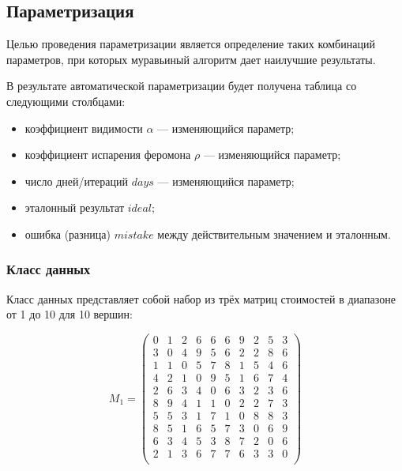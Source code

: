 \subsection{Параметризация}
Целью проведения параметризации является определение таких комбинаций параметров, при которых муравьиный алгоритм дает наилучшие результаты.

В результате автоматической параметризации будет получена таблица со следующими столбцами:
\begin{itemize}[label*={---}]
	\item коэффициент видимости $\alpha$ --- изменяющийся параметр;
	\item коэффициент испарения феромона $\rho$ --- изменяющийся параметр;
	\item число дней/итераций $days$ --- изменяющийся параметр;
	\item эталонный результат $ideal$;
	\item ошибка (разница) $mistake$ между действительным значением и эталонным.
\end{itemize}


\subsubsection{Класс данных}

Класс данных представляет собой набор из трёх матриц стоимостей в диапазоне от 1 до 10 для 10 вершин:

\begin{equation}
	\label{eq:new_matrix1}
	M_{1} = \begin{pmatrix}
		0 & 1 & 2 & 6 & 6 & 6 & 9 & 2 & 5 & 3 \\
		3 & 0 & 4 & 9 & 5 & 6 & 2 & 2 & 8 & 6 \\
		1 & 1 & 0 & 5 & 7 & 8 & 1 & 5 & 4 & 6 \\
		4 & 2 & 1 & 0 & 9 & 5 & 1 & 6 & 7 & 4 \\
		2 & 6 & 3 & 4 & 0 & 6 & 3 & 2 & 3 & 6 \\
		8 & 9 & 4 & 1 & 1 & 0 & 2 & 2 & 7 & 3 \\
		5 & 5 & 3 & 1 & 7 & 1 & 0 & 8 & 8 & 3 \\
		8 & 5 & 1 & 6 & 5 & 7 & 3 & 0 & 6 & 9 \\
		6 & 3 & 4 & 5 & 3 & 8 & 7 & 2 & 0 & 6 \\
		2 & 1 & 3 & 6 & 7 & 7 & 6 & 3 & 3 & 0 \\
	\end{pmatrix}
\end{equation}


